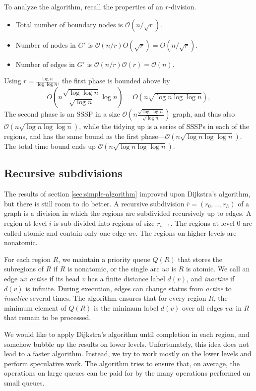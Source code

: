 \documentclass[11pt]{article}
\begin{document}
To analyze the algorithm, recall the properties of an $r$-division.
\begin{itemize}
\item Total number of boundary nodes is $\mathcal{O}(n/\sqrt{r})$.
\item Number of nodes in $G'$ is $\mathcal{O}(n/r)O(\sqrt{r})=O(n/\sqrt{r})$.
\item Number of edges in $G'$ is $\mathcal{O}(n/r)\mathcal{O}(r) = \mathcal{O}(n)$.
\end{itemize}

Using $r=\frac{\log n}{\log \log n}$, the first phase is bounded above by
\[
  O\left(n\frac{\sqrt{\log \log n}}{\sqrt{\log n}} \log n\right)= O(n \sqrt{\log n \log \log n}),
\]
The second phase is an SSSP in a size $\mathcal{O}(n \frac{\sqrt{\log \log n}}{\sqrt{\log n}})$ graph, and thus also $\mathcal{O}(n \sqrt{\log n \log \log n})$, while the tidying up is a series of SSSPs in each of the regions, and has the same bound as the first phase---$\mathcal{O}(n \sqrt{\log n \log \log n})$. The total time bound ends up $\mathcal{O}(n \sqrt{\log n \log \log n})$.

\subsection{Recursive subdivisions}
\label{sec:recursion}

The results of section \ref{sec:simple-algorithm} improved upon Dijkstra's algorithm, but there is still room to do better. A recursive subdivision $\bar{r} = (r_0, \ldots, r_h)$ of a graph is a division in which the regions are subdivided recursively up to edges. A region at level $i$ is sub-divided into regions of size $r_{i-1}$. The regions at level $0$ are called atomic and contain only one edge $uv$. The regions on higher levels are nonatomic.

For each region $R$, we maintain a priority queue $Q(R)$ that stores the subregions of $R$ if $R$ is nonatomic, or the single arc $uv$ is $R$ is atomic. We call an edge $uv$ \emph{active} if its head $v$ has a finite distance label $d(v)$, and \emph{inactive} if $d(v)$ is infinite. During execution, edges can change status from \emph{active} to \emph{inactive} several times. The algorithm ensures that for every region $R$, the minimum element of $Q(R)$ is the minimum label $d(v)$ over all edges $vw$ in $R$ that remain to be processed.

We would like to apply Dijkstra's algorithm until completion in each region, and somehow bubble up the results on lower levels. Unfortunately, this idea does not lead to a faster algorithm. Instead, we try to work mostly on the lower levels and perform speculative work. The algorithm tries to ensure that, on average, the operations on large queues can be paid for by the many operations performed on small queues.
\end{document}
